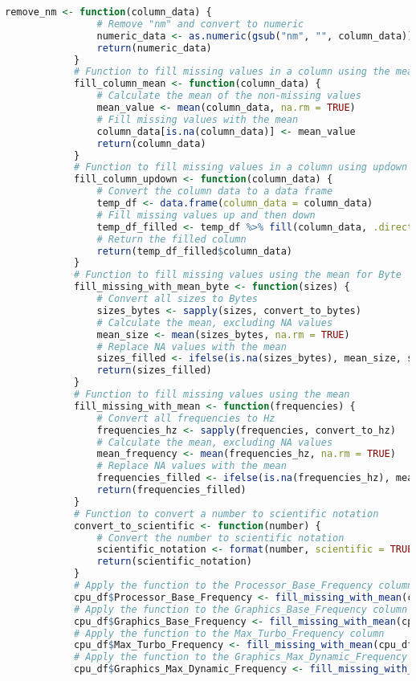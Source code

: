 \documentclass{article}
\begin{document}
\begin{itemize}
\begin{lstlisting}[language=R]
			remove_nm <- function(column_data) {
				# Remove "nm" and convert to numeric
				numeric_data <- as.numeric(gsub("nm", "", column_data))
				return(numeric_data)
			}
			# Function to fill missing values in a column using the mean method
			fill_column_mean <- function(column_data) {
				# Calculate the mean of the non-missing values
				mean_value <- mean(column_data, na.rm = TRUE)
				# Fill missing values with the mean
				column_data[is.na(column_data)] <- mean_value
				return(column_data)
			}
			# Function to fill missing values in a column using updown method
			fill_column_updown <- function(column_data) {
				# Convert the column data to a data frame
				temp_df <- data.frame(column_data = column_data)
				# Fill missing values up and then down
				temp_df_filled <- temp_df %>% fill(column_data, .direction = "updown")
				# Return the filled column
				return(temp_df_filled$column_data)
			}
			# Function to fill missing values using the mean for Byte
			fill_missing_with_mean_byte <- function(sizes) {
				# Convert all sizes to Bytes
				sizes_bytes <- sapply(sizes, convert_to_bytes)
				# Calculate the mean, excluding NA values
				mean_size <- mean(sizes_bytes, na.rm = TRUE)
				# Replace NA values with the mean
				sizes_filled <- ifelse(is.na(sizes_bytes), mean_size, sizes_bytes)
				return(sizes_filled)
			}
			# Function to fill missing values using the mean
			fill_missing_with_mean <- function(frequencies) {
				# Convert all frequencies to Hz
				frequencies_hz <- sapply(frequencies, convert_to_hz)
				# Calculate the mean, excluding NA values
				mean_frequency <- mean(frequencies_hz, na.rm = TRUE)
				# Replace NA values with the mean
				frequencies_filled <- ifelse(is.na(frequencies_hz), mean_frequency, frequencies_hz)
				return(frequencies_filled)
			}
			# Function to convert a number to scientific notation
			convert_to_scientific <- function(number) {
				# Convert the number to scientific notation
				scientific_notation <- format(number, scientific = TRUE)
				return(scientific_notation)
			}
			# Apply the function to the Processor_Base_Frequency column
			cpu_df$Processor_Base_Frequency <- fill_missing_with_mean(cpu_df$Processor_Base_Frequency)
			# Apply the function to the Graphics_Base_Frequency column
			cpu_df$Graphics_Base_Frequency <- fill_missing_with_mean(cpu_df$Graphics_Base_Frequency)
			# Apply the function to the Max_Turbo_Frequency column
			cpu_df$Max_Turbo_Frequency <- fill_missing_with_mean(cpu_df$Max_Turbo_Frequency)
			# Apply the function to the Graphics_Max_Dynamic_Frequency column
			cpu_df$Graphics_Max_Dynamic_Frequency <- fill_missing_with_mean(cpu_df$Graphics_Max_Dynamic_Frequency)

\end{lstlisting}
\end{itemize}
\end{document}
